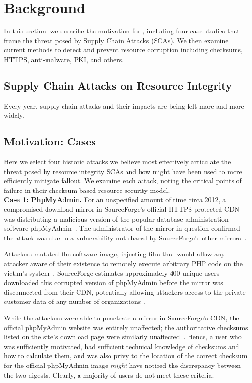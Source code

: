 \section{Background} \label{sec:background}

In this section, we describe the motivation for \SYSTEM{}, including four case
studies that frame the threat posed by Supply Chain Attacks (SCAs). We then
examine current methods to detect and prevent resource corruption including
checksums, HTTPS, anti-malware, PKI, and others.

\subsection{Supply Chain Attacks on Resource Integrity}

Every year, supply chain attacks and their impacts are being felt more and more
widely. 

\subsection{Motivation: Cases}

Here we select four historic attacks we believe most effectively articulate the
threat posed by resource integrity SCAs and how \SYSTEM{} might have been used
to more efficiently mitigate fallout. We examine each attack, noting the
critical points of failure in their checksum-based resource security model. \\

\noindent\textbf{Case 1: PhpMyAdmin.} For an unspecified amount of time circa
2012, a compromised download mirror in SourceForge's official HTTPS-protected
CDN was distributing a malicious version of the popular database administration
software phpMyAdmin~\cite{SCA-PMA3}. The administrator of the mirror in question
confirmed the attack was due to a vulnerability not shared by SourceForge's
other mirrors~\cite{SCA-PMA2}.

Attackers mutated the software image, injecting files that would allow any
attacker aware of their existence to remotely execute arbitrary PHP code on the
victim's system~\cite{SCA-PMA1}. SourceForge estimates approximately 400 unique
users downloaded this corrupted version of phpMyAdmin before the mirror was
disconnected from their CDN, potentially allowing attackers access to the
private customer data of any number of organizations~\cite{SCA-PMA2}.

While the attackers were able to penetrate a mirror in SourceForge's CDN, the
official phpMyAdmin website was entirely unaffected; the authoritative checksums
listed on the site's download page were similarly unaffected~\cite{SCA-PMA2}.
Hence, a user who was sufficiently motivated, had sufficient technical knowledge
of checksums and how to calculate them, and was also privy to the location of
the correct checksum for the official phpMyAdmin image \emph{might} have
noticed the discrepancy between the two digests. Clearly, a majority of users do
not meet these criteria. \\

